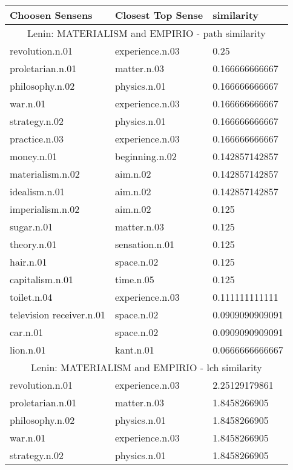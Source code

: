 
    \begin{center}
      \begin{tabular}{ | l | l | l |}
        \hline
        Choosen Sensens & Closest Top Sense & similarity  \\ \hline
\multicolumn{3}{|c|}{Lenin: MATERIALISM and EMPIRIO - path similarity} \\ \hline
revolution.n.01 & experience.n.03 & 0.25\\ \hline
proletarian.n.01 & matter.n.03 & 0.166666666667\\ \hline
philosophy.n.02 & physics.n.01 & 0.166666666667\\ \hline
war.n.01 & experience.n.03 & 0.166666666667\\ \hline
strategy.n.02 & physics.n.01 & 0.166666666667\\ \hline
practice.n.03 & experience.n.03 & 0.166666666667\\ \hline
money.n.01 & beginning.n.02 & 0.142857142857\\ \hline
materialism.n.02 & aim.n.02 & 0.142857142857\\ \hline
idealism.n.01 & aim.n.02 & 0.142857142857\\ \hline
imperialism.n.02 & aim.n.02 & 0.125\\ \hline
sugar.n.01 & matter.n.03 & 0.125\\ \hline
theory.n.01 & sensation.n.01 & 0.125\\ \hline
hair.n.01 & space.n.02 & 0.125\\ \hline
capitalism.n.01 & time.n.05 & 0.125\\ \hline
toilet.n.04 & experience.n.03 & 0.111111111111\\ \hline
television receiver.n.01 & space.n.02 & 0.0909090909091\\ \hline
car.n.01 & space.n.02 & 0.0909090909091\\ \hline
lion.n.01 & kant.n.01 & 0.0666666666667\\ \hline
\multicolumn{3}{|c|}{Lenin: MATERIALISM and EMPIRIO - lch similarity} \\ \hline
revolution.n.01 & experience.n.03 & 2.25129179861\\ \hline
proletarian.n.01 & matter.n.03 & 1.8458266905\\ \hline
philosophy.n.02 & physics.n.01 & 1.8458266905\\ \hline
war.n.01 & experience.n.03 & 1.8458266905\\ \hline
strategy.n.02 & physics.n.01 & 1.8458266905\\ \hline

\end{tabular}
\end{center}
